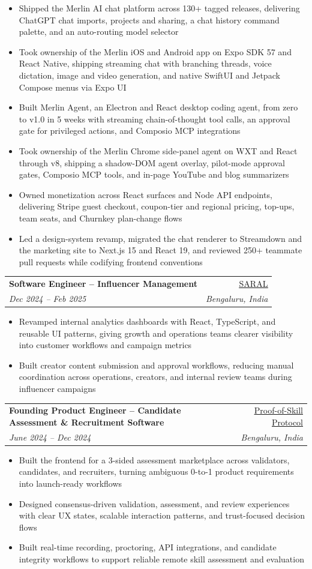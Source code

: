 \documentclass[letterpaper,10pt]{article}
\makeatletter
\let\originalhref\href
\renewcommand{\href}[2]{\originalhref{#1}{\underline{#2}}}
\newcommand{\resumeItem}[1]{
\item\small{{#1 \vspace{-2pt}}}
}
\newcommand{\resumeSubheading}[4]{
\vspace{-2pt}\item
\begin{tabular*}{0.97\textwidth}[t]{l@{\extracolsep{\fill}}r}
\textbf{#1} & #2 \\
\textit{\small#3} & \textit{\small #4} \\
\end{tabular*}\vspace{-7pt}
}
\newcommand{\resumeItemListStart}{\begin{itemize}[leftmargin=*]}
\newcommand{\resumeItemListEnd}{\end{itemize}\vspace{-5pt}}
\makeatother
\begin{document}
\resumeItemListStart
\resumeItem{Shipped the Merlin AI chat platform across 130+ tagged releases, delivering ChatGPT chat imports, projects and sharing, a chat history command palette, and an auto-routing model selector}
\resumeItem{Took ownership of the Merlin iOS and Android app on Expo SDK 57 and React Native, shipping streaming chat with branching threads, voice dictation, image and video generation, and native SwiftUI and Jetpack Compose menus via Expo UI}
\resumeItem{Built Merlin Agent, an Electron and React desktop coding agent, from zero to v1.0 in 5 weeks with streaming chain-of-thought tool calls, an approval gate for privileged actions, and Composio MCP integrations}
\resumeItem{Took ownership of the Merlin Chrome side-panel agent on WXT and React through v8, shipping a shadow-DOM agent overlay, pilot-mode approval gates, Composio MCP tools, and in-page YouTube and blog summarizers}
\resumeItem{Owned monetization across React surfaces and Node API endpoints, delivering Stripe guest checkout, coupon-tier and regional pricing, top-ups, team seats, and Churnkey plan-change flows}
\resumeItem{Led a design-system revamp, migrated the chat renderer to Streamdown and the marketing site to Next.js 15 and React 19, and reviewed 250+ teammate pull requests while codifying frontend conventions}
\resumeItemListEnd

\resumeSubheading
{Software Engineer -- Influencer Management}
{\href{https://www.getsaral.com/}{SARAL}}
{Dec 2024 -- Feb 2025}
{Bengaluru, India}

\resumeItemListStart
\resumeItem{Revamped internal analytics dashboards with React, TypeScript, and reusable UI patterns, giving growth and operations teams clearer visibility into customer workflows and campaign metrics}
\resumeItem{Built creator content submission and approval workflows, reducing manual coordination across operations, creators, and internal review teams during influencer campaigns}
\resumeItemListEnd

\resumeSubheading
{Founding Product Engineer -- Candidate Assessment \& Recruitment Software}
{\href{https://www.proofofskill.org/}{Proof-of-Skill Protocol}}
{June 2024 -- Dec 2024}
{Bengaluru, India}

\resumeItemListStart
\resumeItem{Built the frontend for a 3-sided assessment marketplace across validators, candidates, and recruiters, turning ambiguous 0-to-1 product requirements into launch-ready workflows}
\resumeItem{Designed consensus-driven validation, assessment, and review experiences with clear UX states, scalable interaction patterns, and trust-focused decision flows}
\resumeItem{Built real-time recording, proctoring, API integrations, and candidate integrity workflows to support reliable remote skill assessment and evaluation}
\resumeItemListEnd
\end{document}

